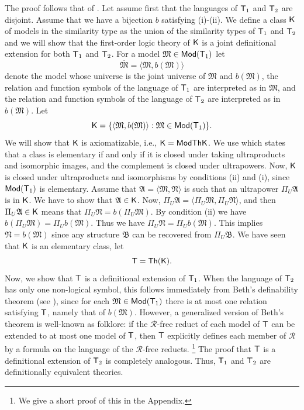 \documentclass[12pt,leqno]{article}
\newcommand{\Mm}{\mbox{$\mathfrak M$}}
\newcommand{\Nn}{\mbox{$\mathfrak N$}}
\newcommand{\Aa}{\mbox{$\mathfrak A$}}
\newcommand{\Bb}{\mbox{$\mathfrak B$}}
\newcommand{\Th}{\mbox{\sf Th}}
\newcommand{\T}{\mbox{\sf T}}
\newcommand{\K}{\mbox{\sf K}}
\newcommand{\Mod}{\mbox{\sf Mod}}
\newcommand{\RR}{\mathcal{R}}
\begin{document}
	The proof follows that of
\cite[Theorem]{vBP}. Let assume first that the languages of $\T_1$
and $\T_2$ are disjoint. Assume that we have a bijection $b$
satisfying (i)-(ii). We define a class $\K$ of models in the
similarity type as the union of the similarity types of $\T_1$ and
$\T_2$ and we will show that the first-order logic theory of $\K$ is a
joint definitional extension for both $\T_1$ and $\T_2$. For a model
$\Mm\in\Mod(\T_1)$ let \[ \overline{\Mm}=\langle \Mm,
b(\Mm)\rangle\]  denote the model whose universe is the joint
universe of $\Mm$ and $b(\Mm)$, the relation and function symbols of
the language of $\T_1$ are interpreted as in $\Mm$, and the relation
and function symbols of the language of $\T_2$ are interpreted as in
$b(\Mm)$. Let
\[ \K = \{ \langle\Mm,b(\Mm)\rangle : \Mm\in\Mod(\T_1) \}  .\]
We will show that $\K$ is axiomatizable, i.e., $\K=\Mod\Th\K$. We
use \cite[Cor.6.1.16(i)]{CK} which states that a class is elementary
if and only if it is closed under taking ultraproducts and
isomorphic images, and the complement is closed under ultrapowers.
Now, $\K$ is closed under ultraproducts and isomorphisms by
conditions (ii) and (i), since $\Mod(\T_1)$ is elementary. Assume
that  $\Aa=\langle \Mm,\Nn\rangle$ is such that an ultrapower
$\Pi_U\Aa$ is in $\K$. We have to show that $\Aa\in\K$. Now,
$\Pi_U\Aa=\langle\Pi_U \Mm,\Pi_U\Nn\rangle$, and then
$\Pi_U\Aa\in\K$ means that $\Pi_U \Nn=b(\Pi_U \Mm)$. By
condition (ii) we have $b(\Pi_U\Mm)=\Pi_U b(\Mm)$. Thus
we have $\Pi_U\Nn=\Pi_U b(\Mm)$. This implies
$\Nn=b(\Mm)$ since any structure $\Bb$ can be recovered from
$\Pi_U\Bb$. We have seen that $\K$ is an elementary class, let
\[ \T = \Th(\K) .\]
Now, we show that $\T$ is a definitional extension of $\T_1$. When
the language of $\T_2$ has only one non-logical symbol, this follows
immediately from Beth's definability theorem (see
\cite[Thm.2.2.22]{CK}), since for each $\Mm\in\Mod(\T_1)$ there is
at most one relation satisfying $\T$, namely that of $b(\Mm)$.
However, a generalized version of Beth's theorem is well-known as
folklore: if the $\RR$-free reduct of each model of $\T$ can be 
extended to at most one model of $\T$, then $\T$ explicitly defines 
each member of $\RR$ by a formula on the language of the $\RR$-free reducts.%
%
\footnote{We give a short proof of this in the Appendix.}
The proof that $\T$ is a
definitional extension of $\T_2$ is completely analogous. Thus,
$\T_1$ and $\T_2$ are definitionally equivalent theories.
\end{document}
